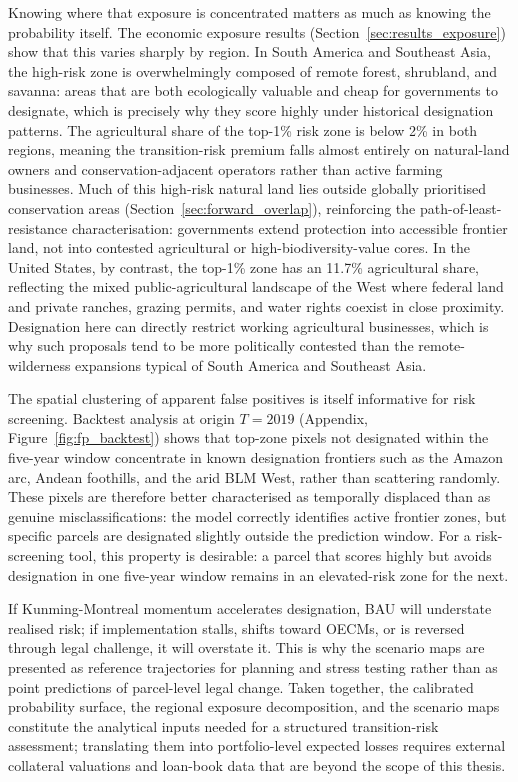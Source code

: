 \documentclass[12pt]{article}
\theoremstyle{break}
\begin{document}
Knowing where that exposure is concentrated matters as much as
knowing the probability itself. The economic exposure results
(Section~\ref{sec:results_exposure}) show that this varies sharply by region.
In South America and Southeast Asia, the high-risk zone is overwhelmingly composed
of remote forest, shrubland, and savanna: areas that are both ecologically valuable
and cheap for governments to designate, which is precisely why they score highly
under historical designation patterns. The agricultural share of the top-1\% risk
zone is below 2\% in both regions, meaning the transition-risk premium falls almost
entirely on natural-land owners and conservation-adjacent operators rather than
active farming businesses. Much of this high-risk natural land lies outside globally
prioritised conservation areas (Section~\ref{sec:forward_overlap}), reinforcing the
path-of-least-resistance characterisation: governments extend protection into
accessible frontier land, not into contested agricultural or high-biodiversity-value
cores. In the United States, by contrast, the top-1\% zone has an 11.7\% agricultural
share, reflecting the mixed public-agricultural landscape of the West where federal
land and private ranches, grazing permits, and water rights coexist in close
proximity. Designation here can directly restrict working agricultural businesses,
which is why such proposals tend to be more politically contested than the
remote-wilderness expansions typical of South America and Southeast Asia.

The spatial clustering of apparent false positives is itself informative for risk
screening. Backtest analysis at origin $T=2019$ (Appendix, Figure~\ref{fig:fp_backtest})
shows that top-zone pixels not designated within the five-year window concentrate
in known designation frontiers such as the Amazon arc, Andean foothills, and the arid
BLM West, rather than scattering randomly. These pixels are therefore better
characterised as temporally displaced than as genuine misclassifications:
the model correctly identifies active frontier zones, but specific parcels are
designated slightly outside the prediction window. For a risk-screening tool, this
property is desirable: a parcel that scores highly but avoids designation in one
five-year window remains in an elevated-risk zone for the next.

If Kunming-Montreal momentum accelerates designation, BAU will understate realised
risk; if implementation stalls, shifts toward OECMs, or is reversed through legal
challenge, it will overstate it. This is why the scenario maps are presented as
reference trajectories for planning and stress testing rather than as point
predictions of parcel-level legal change. Taken together, the calibrated probability
surface, the regional exposure decomposition, and the scenario maps constitute the
analytical inputs needed for a structured transition-risk assessment; translating
them into portfolio-level expected losses requires external collateral valuations
and loan-book data that are beyond the scope of this thesis.
\end{document}
